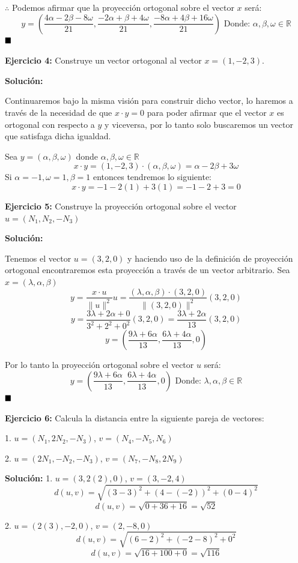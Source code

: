 \documentclass{article}
\begin{document}
$\therefore$ Podemos afirmar que la proyección ortogonal sobre el vector $x$ será:
$$y = (\frac{4\alpha-2\beta-8\omega}{21}, \frac{-2\alpha+\beta+4\omega}{21}, \frac{-8\alpha+4\beta+16\omega}{21})\text{ Donde: } \alpha, \beta , \omega \in \mathbb{R}$$
$\hfill\blacksquare$
\vspace{10pt}


\textbf{Ejercicio 4: }Construye un vector ortogonal al vector $x = (1,-2,3)$.
\vspace{10pt}


\textbf{Solución:}
\vspace{10pt}


Continuaremos bajo la misma visión para construir dicho vector, lo haremos a través de la necesidad de que $x\cdot y = 0$ para poder afirmar que el vector $x$ es ortogonal con
respecto a $y$ y viceversa, por lo tanto solo buscaremos un vector que satisfaga dicha igualdad.\par
Sea $y = (\alpha , \beta, \omega)$ donde $\alpha, \beta , \omega \in \mathbb{R}$
$$x\cdot y =(1,-2,3) \cdot (\alpha , \beta, \omega) = \alpha-2\beta+3\omega$$
Si $\alpha = -1, \omega=1 , \beta= 1$ entonces tendremos lo siguiente:
$$x\cdot y = -1-2(1)+3(1) = -1-2+3 = 0$$


\textbf{Ejercicio 5: }Construye la proyección ortogonal sobre el vector $u = (N_1, N_2, -N_3)$
\vspace{10pt}


\textbf{Solución:}
\vspace{10pt}


Tenemos el vector $u = (3, 2, 0)$ y haciendo uso de la definición de proyección ortogonal encontraremos esta proyección a través de un vector arbitrario.
Sea $x =(\lambda, \alpha, \beta)$
$$y = \frac{x\cdot u}{\|u\|^2}u = \frac{(\lambda, \alpha, \beta) \cdot(3, 2, 0) }{\|(3, 2, 0)\|^2}(3, 2, 0)$$
$$y =\frac{3\lambda+2\alpha+ 0}{3^2 + 2^2 +0^2}(3, 2, 0) = \frac{3\lambda+2\alpha}{13}(3, 2, 0) $$
$$y = (\frac{9\lambda+6\alpha}{13}, \frac{6\lambda+4\alpha}{13}, 0)$$


Por lo tanto la proyección ortogonal sobre el vector $u$ será:
$$y = (\frac{9\lambda+6\alpha}{13}, \frac{6\lambda+4\alpha}{13}, 0) \text{  Donde: } \lambda, \alpha, \beta \in \mathbb{R}$$
$\hfill\blacksquare$
\vspace{10pt}


\textbf{Ejercicio 6:} Calcula la distancia entre la siguiente pareja de vectores:




1. $u = (N_1, 2N_2, -N_3)$, $v = (N_4, -N_5, N_6)$


2. $u =(2N_1, -N_2, -N_3)$, $v = (N_7, -N_8, 2N_9)$
\vspace{10pt}


\textbf{Solución:}
\vspace{10pt}
1. $u = (3, 2(2), 0)$, $v = (3, -2, 4)$
$$d(u,v) = \sqrt{(3-3)^2+(4-(-2))^2+(0-4)^2}$$
$$d(u,v) = \sqrt{0+36+16} = \sqrt{52}$$


2. $u =(2(3), -2, 0)$, $v = (2, -8, 0)$
$$d(u,v) = \sqrt{(6-2)^2+(-2-8)^2+0^2}$$
$$d(u,v) = \sqrt{16+100+0} = \sqrt{116}$$
\end{document}
